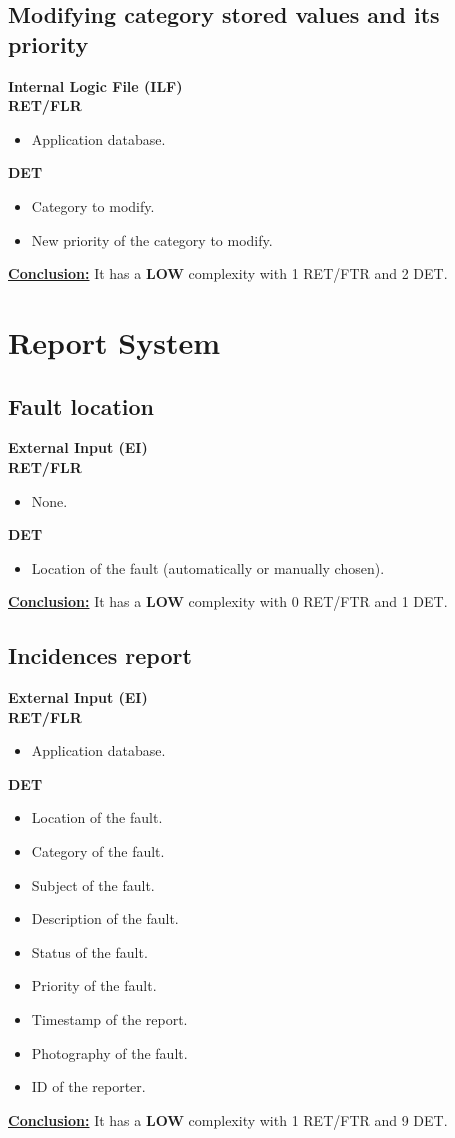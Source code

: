 \subsection{Modifying category stored values and its priority}
\textbf{Internal Logic File (ILF)} \\ 
\textbf{RET/FLR}
\begin{itemize}
\item Application database.
\end{itemize}
\textbf{DET}
\begin{itemize}
\item Category to modify.
\item New priority of the category to modify.
\end{itemize}
\textbf{\underline{Conclusion:}} It has a \textbf{LOW} complexity with 1 RET/FTR and 2 DET.	



\section{Report System}



\subsection{Fault location}
\textbf{External Input (EI)} \\ 
\textbf{RET/FLR}
\begin{itemize}
\item None.
\end{itemize}
\textbf{DET}
\begin{itemize}
\item Location of the fault (automatically or manually chosen).
\end{itemize}
\textbf{\underline{Conclusion:}} It has a \textbf{LOW} complexity with 0 RET/FTR and 1 DET.

\subsection{Incidences report}
\textbf{External Input (EI)} \\ 
\textbf{RET/FLR}
\begin{itemize}
\item Application database.
\end{itemize}
\textbf{DET}
\begin{itemize}
\item Location of the fault.
\item Category of the fault.
\item Subject of the fault.
\item Description of the fault.
\item Status of the fault.
\item Priority of the fault.
\item Timestamp of the report.
\item Photography of the fault.
\item ID of the reporter.
\end{itemize}
\textbf{\underline{Conclusion:}} It has a \textbf{LOW} complexity with 1 RET/FTR and 9 DET.

